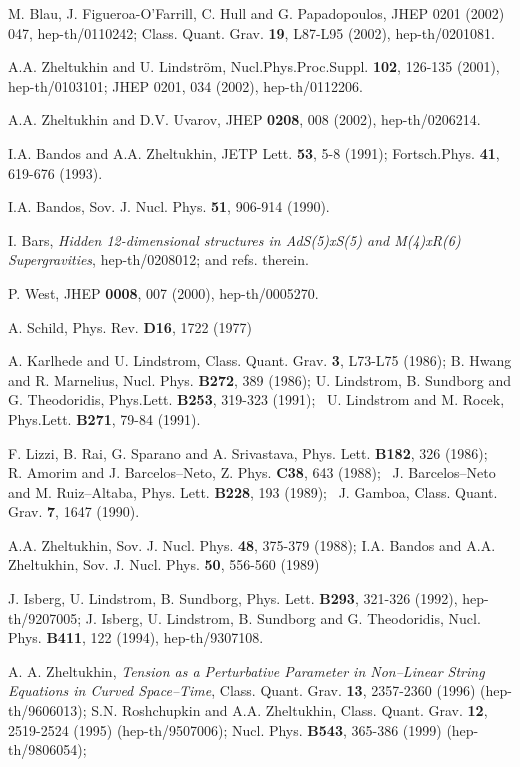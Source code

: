\documentclass[a4paper,11pt]{article}
\begin{document}
{\begin{thebibliography}{99}
 M. Blau, J. Figueroa-O'Farrill, C. Hull and G. Papadopoulos, 
JHEP 0201 (2002) 047, hep-th/0110242; 
Class. Quant. Grav. {\bf 19}, L87-L95 (2002), hep-th/0201081.         


 A.A. Zheltukhin and U. Lindstr\"{o}m,  
Nucl.Phys.Proc.Suppl. {\bf 102}, 126-135 (2001),  hep-th/0103101;
JHEP 0201, 034 (2002), hep-th/0112206.  

 A.A. Zheltukhin and D.V. Uvarov, 
JHEP {\bf 0208}, 008 (2002), hep-th/0206214. 

   I.A. Bandos and A.A. Zheltukhin, 
JETP Lett. {\bf 53}, 5-8 (1991);  
Fortsch.Phys. {\bf 41}, 619-676 
(1993).  

I.A. Bandos, 
Sov. J. Nucl. Phys. {\bf 51}, 906-914 (1990). 

I. Bars, 
{\sl Hidden 12-dimensional structures in 
AdS(5)xS(5) and M(4)xR(6) Supergravities}, 
hep-th/0208012; and refs. therein. 

P. West, JHEP {\bf 0008}, 007 (2000), hep-th/0005270.

A. Schild, Phys. Rev. {\bf D16}, 1722 (1977)

A. Karlhede and U. Lindstrom,  
Class. Quant. Grav. {\bf 3}, L73-L75 (1986);  
B. Hwang and R. Marnelius, Nucl. Phys. {\bf B272}, 389 (1986); 
U. Lindstrom, B. Sundborg and  G. Theodoridis, 
Phys.Lett. {\bf B253}, 319-323 (1991); \,  
U. Lindstrom and M. Rocek, 
Phys.Lett. {\bf B271}, 79-84 (1991).  


F. Lizzi, B. Rai, G. Sparano and A. Srivastava, Phys. Lett. 
{\bf B182}, 326 (1986); \, R. Amorim and J. Barcelos--Neto, 
Z. Phys. {\bf C38}, 643 (1988); \, J. Barcelos--Neto and M. Ruiz--Altaba, 
  Phys. Lett. {\bf B228}, 193 (1989); \,  
J. Gamboa, Class. Quant. Grav. {\bf 7}, 1647 (1990).


A.A. Zheltukhin, 
Sov. J. Nucl. Phys. {\bf 48}, 375-379 (1988); 
I.A. Bandos and A.A. Zheltukhin, 
Sov. J. Nucl. Phys. {\bf 50}, 556-560 (1989) 



J. Isberg, U. Lindstrom, B. Sundborg, 
Phys. Lett. {\bf B293}, 321-326 (1992), hep-th/9207005;  
J. Isberg, U. Lindstrom, B. Sundborg and G. Theodoridis, 
Nucl. Phys. {\bf B411}, 122 (1994), hep-th/9307108. 

 A. A. Zheltukhin, {\sl Tension as a Perturbative Parameter in 
Non--Linear String Equations in Curved Space--Time}, 
Class. Quant. Grav. {\bf 13}, 2357-2360 (1996) (hep-th/9606013); 
 S.N. Roshchupkin and A.A. Zheltukhin, 
Class. Quant. Grav. {\bf 12}, 2519-2524  (1995) 
(hep-th/9507006); 
Nucl. Phys. {\bf B543}, 365-386 (1999) (hep-th/9806054); 



\end{thebibliography}}
\end{document}
